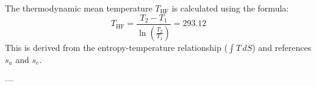 The thermodynamic mean temperature \( T_{\text{HF}} \) is calculated using the formula:  
\[
T_{\text{HF}} = \frac{T_2 - T_1}{\ln\left(\frac{T_2}{T_1}\right)} = 293.12
\]  
This is derived from the entropy-temperature relationship (\( \int T \, dS \)) and references \( s_a \) and \( s_e \).

---